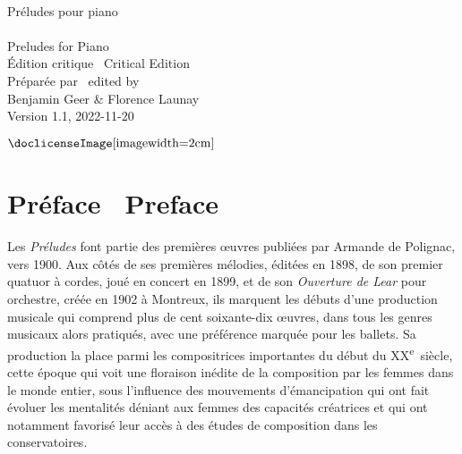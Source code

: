 \documentclass[a4paper, 12pt]{book}
\newcommand{\bigdot}[0]{{\Large \textbullet}}
\begin{document}
\frontmatter


\begin{titlepage}
\begin{center}
   \\
  \vspace{3.25 cm}
  {\fontsize{30}{40}\selectfont Préludes pour piano} \\
  \vspace{0.5 cm}
  {\fontsize{30}{40}\selectfont \textbullet} \\
  \vspace{0.35 cm}
  {\fontsize{30}{40}\selectfont Preludes for Piano} \\
  \vspace{3.25 cm}
  {\Large Édition critique \textbullet\ Critical Edition} \\
  \vspace{3.25 cm}
  {\Large Préparée par \textbullet\ \foreignlanguage{english}{edited by}} \\
  \vspace{0.25 cm}
  {\Large Benjamin Geer \& Florence Launay} \\
  \vspace{3.25 cm}
  {\footnotesize Version 1.1, 2022-11-20} \\
  \vspace{0.25 cm}
  \begin{minipage}{\textwidth}
  \centering
  $\vcenter{\hbox{\doclicenseImage[imagewidth=2cm]}}$
  \end{minipage}
  \end{center}
\end{titlepage}


\chapter*{Préface \bigdot\ \foreignlanguage{english}{Preface}}

Les \emph{Préludes} font partie des premières œuvres publiées par
Armande de Polignac, vers 1900. Aux côtés de ses premières mélodies,
éditées en 1898, de son premier quatuor à cordes, joué en concert en
1899, et de son \emph{Ouverture de Lear} pour orchestre, créée en 1902 à
Montreux, ils marquent les débuts d'une production musicale qui comprend
plus de cent soixante-dix œuvres, dans tous les genres musicaux alors
pratiqués, avec une préférence marquée pour les ballets. Sa production
la place parmi les compositrices importantes du début du
XX\textsuperscript{e}~siècle, cette époque qui voit une floraison
inédite de la composition par les femmes dans le monde entier, sous
l'influence des mouvements d'émancipation qui ont fait évoluer les
mentalités déniant aux femmes des capacités créatrices et qui ont
notamment favorisé leur accès à des études de composition dans les
conservatoires.
\end{document}
